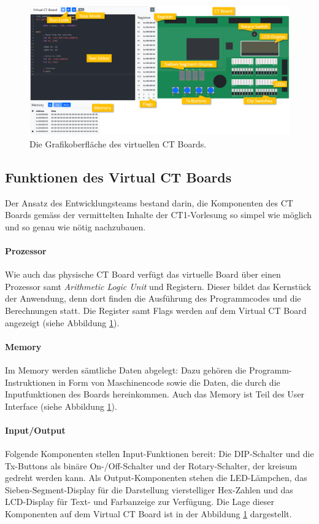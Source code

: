 \documentclass[10pt]{article}
\begin{document}
\begin{figure}[h]
\includegraphics[width=\textwidth]{final}
\caption[size=8pt]{Die Grafikoberfläche des virtuellen CT Boards.}
\label{final}
\end{figure}

\subsection{Funktionen des \glqq Virtual CT Boards\grqq}

Der Ansatz des Entwicklungsteams bestand darin, die Komponenten des CT Boards gemäss der vermittelten Inhalte der CT1-Vorlesung so simpel wie möglich und so genau wie nötig nachzubauen.

\paragraph{Prozessor} Wie auch das physische CT Board verfügt das virtuelle Board über einen Prozessor samt \emph{Arithmetic Logic Unit} und Registern. Dieser bildet das Kernstück der Anwendung, denn dort finden die Ausführung des Programmcodes und die Berechnungen statt. Die Register samt Flags werden auf dem \glqq Virtual CT Board\grqq{} angezeigt (siehe Abbildung \ref{final}).

\paragraph{Memory} Im Memory werden sämtliche Daten abgelegt: Dazu gehören die Programm-Instruktionen in Form von Maschinencode sowie die Daten, die durch die Inputfunktionen des Boards hereinkommen. Auch das Memory ist Teil des User Interface (siehe Abbildung \ref{final}).

\paragraph{Input/Output} Folgende Komponenten stellen Input-Funktionen bereit: Die DIP-Schalter und die Tx-Buttons als binäre On-/Off-Schalter und der Rotary-Schalter, der kreisum gedreht werden kann. Als Output-Komponenten stehen die LED-Lämpchen, das Sieben-Segment-Display für die Darstellung vierstelliger Hex-Zahlen und das LCD-Display für Text- und Farbanzeige zur Verfügung. Die Lage dieser Komponenten auf dem \glqq Virtual CT Board\grqq{} ist in der Abbildung \ref{final} dargestellt.
\end{document}
